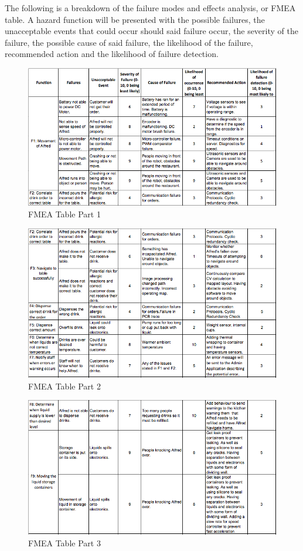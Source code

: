 \documentclass [10pt]{article}
\begin{document}
The following is a breakdown of the failure modes and effects analysis, or FMEA table. A hazard function will be presented with the possible failures, the unacceptable events that could occur should said failure occur, the severity of the failure, the possible cause of said failure, the likelihood of the failure, recommended action and the likelihood of failure detection.

\begin{figure} [h!]
	\centering
	\includegraphics [scale = 0.7] {figures/FMEA_1.png}
	\caption{FMEA Table Part 1}
\end{figure}

\begin{figure} [h!]
	\centering
	\includegraphics [scale = 0.7] {figures/FMEA_2.png}
	\caption{FMEA Table Part 2}
\end{figure}

\begin{figure} [h!]
	\centering
	\includegraphics [scale = 0.7] {figures/FMEA_3.png}
	\caption{FMEA Table Part 3}
\end{figure}
\end{document}
